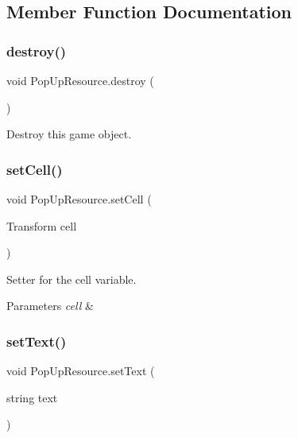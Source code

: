 \subsection{Member Function Documentation}
\mbox{\label{class_pop_up_resource_a50e433efaee2506bb7aeaf46692f80bc}} 
\subsubsection{\texorpdfstring{destroy()}{destroy()}}
{\footnotesize\ttfamily void Pop\+Up\+Resource.\+destroy (\begin{DoxyParamCaption}{ }\end{DoxyParamCaption})}



Destroy this game object. 

\mbox{\label{class_pop_up_resource_a9257e3aa653c54790abb63d55bee2190}} 
\subsubsection{\texorpdfstring{set\+Cell()}{setCell()}}
{\footnotesize\ttfamily void Pop\+Up\+Resource.\+set\+Cell (\begin{DoxyParamCaption}\item[{Transform}]{cell }\end{DoxyParamCaption})}



Setter for the cell variable. 


\begin{DoxyParams}{Parameters}
{\em cell} & \\
\hline
\end{DoxyParams}
\mbox{\label{class_pop_up_resource_ab6419b13f96e0a691c259e030b160bff}} 
\subsubsection{\texorpdfstring{set\+Text()}{setText()}}
{\footnotesize\ttfamily void Pop\+Up\+Resource.\+set\+Text (\begin{DoxyParamCaption}\item[{string}]{text }\end{DoxyParamCaption})}



